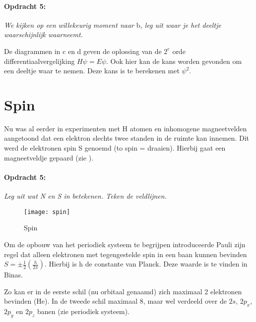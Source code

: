 \paragraph*{Opdracht 5:}

\emph{We kijken op een willekeurig moment naar }b\emph{,
leg uit waar je het deeltje waarschijnlijk waarneemt.}

De diagrammen in c en d
geven de oplossing van de $2^{e}$ orde differentiaalvergelijking
$H\psi=E\psi$. Ook hier kan de kans worden gevonden om een deeltje
waar te nemen. Deze kans is te berekenen met $\psi^{2}$.


\section{Spin}

Nu was al eerder in experimenten met H atomen en inhomogene magneetvelden
aangetoond dat een elektron slechts twee standen in de ruimte kan
innemen. Dit werd de elektronen spin S genoemd (to spin = draaien).
Hierbij gaat een magneetveldje gepaard (zie ).


\paragraph*{Opdracht 5:}

\emph{Leg uit wat N en S in  betekenen. Teken de veldlijnen.}

\begin{figure}[h]
\noindent \begin{centering}
\texttt{[image: spin]}
\par\end{centering}

\caption{\label{fig:Spin}Spin}
\end{figure}


Om de opbouw van het periodiek systeem te begrijpen introduceerde
Pauli zijn regel dat alleen elektronen met tegengestelde spin in een
baan kunnen bevinden $S=\pm\frac{1}{2}(\frac{h}{2\pi})$. Hierbij
is h de constante van Planck. Deze waarde is te vinden in Binas.

Zo kan er in de eerste schil (nu orbitaal genaamd) zich maximaal 2
elektronen bevinden (He). In de tweede schil maximaal 8, maar wel
verdeeld over de $2s$, $2p_{x}$, $2p_{y}$ en $2p_{z}$ banen (zie
periodiek systeem).

